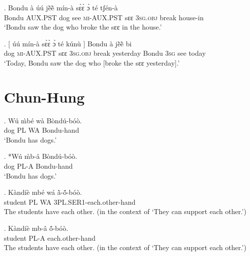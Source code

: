 \documentclass{assets/fieldnotes}
\begin{document}
{\exg. Bondu à úú jẽ̀ẽ̀ mín-à sɛ̀ɛ̀ ɔ̀ té tʃ\'{e}n-\`{a}\\
Bondu \textsc{AUX.PST} dog see \textsc{mi-AUX.PST} sɛɛ \textsc{3sg.obj} break house-in\\
`Bondu saw the dog who broke the sɛɛ in the house.’



\exg. {[} úú mín-à sɛ̀ɛ̀ ɔ̀ té kúnù {]} Bondu à jẽ̀ẽ̀ bi\\
{} dog \textsc{mi-AUX.PST} sɛɛ \textsc{3sg.obj} break yesterday {} Bondu \textsc{3sg} see today\\
`Today, Bondu saw the dog who [broke the sɛɛ yesterday].’


\section{Chun-Hung} 

 \newline

 \newline


\exg. W\'{u} \`{m}b\'{e} w\`{a} B\`{o}nd\'{u}-b\'{o}\`{o}. \\ 
dog PL WA Bondu-hand \\
`Bondu has dogs.' 

\exg. *W\'{u} \`{m}b-\^{a} B\`{o}nd\'{u}-b\'{o}\`{o}. \\ 
dog PL-A Bondu-hand \\
`Bondu has dogs.' 

\exg. K\`{a}nd\'{i}\`{e} mb\'{e} w\'{a} ã̀-\textipa{\textltailn}ṍ-b\'{o}\`{o}. \\
student PL WA 3PL.SER1-each.other-hand \\
The students have each other. (in the context of `They can support each other.')

\exg. K\`{a}nd\'{i}\`{e} mb-\^{a} \textipa{\textltailn}ṍ-b\'{o}\`{o}. \\
student PL-A each.other-hand \\
The students have each other. (in the context of `They can support each other.') 

}
\end{document}
